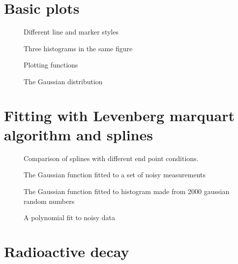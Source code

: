 \documentclass{article}
\begin{document}
\section{Basic plots}
\label{sec:basic}

\begin{figure}[H]
  \centering
  
  \caption{Different line and marker styles}
\end{figure}

\begin{figure}[H]
  \centering
  
  \caption{Three histograms in the same figure}
\end{figure}

\begin{figure}[H]
  \centering
  
  \caption{Plotting functions}
\end{figure}

\begin{figure}[H]
  \centering
  
  \caption{The Gaussian distribution}
\end{figure}

\section{Fitting with Levenberg marquart algorithm and splines}
\label{sec:LMA}

\begin{figure}[H]
  \centering
  
  \caption{Comparison of splines with different end point conditions.}
\end{figure}

\begin{figure}[H]
  \centering
  
  \caption{The Gaussian function fitted to a set of noisy measurements}
\end{figure}

\begin{figure}[H]
  \centering
  
  \caption{The Gaussian function fitted to histogram made from 2000 gaussian random numbers}
\end{figure}

\begin{figure}[H]
  \centering
  
  \caption{A polynomial fit to noisy data}
\end{figure}

\section{Radioactive decay}
\label{sec:decay}
\end{document}
